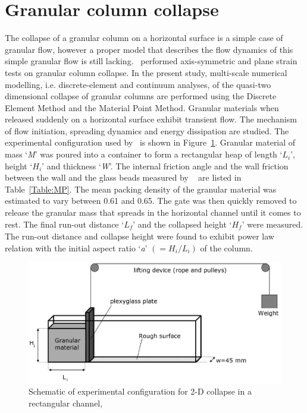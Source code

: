 \section{Granular column collapse}
The collapse of a granular column on a horizontal surface is a simple case of 
granular flow, however a proper model that describes the flow dynamics of this 
simple granular flow is still lacking.~\citet{Lajeunesse2005} performed 
axis-symmetric and plane strain tests on granular column collapse. In the 
present study, multi-scale numerical modelling, i.e. discrete-element and 
continuum analyses, of the quasi-two dimensional collapse of granular columns 
are performed using the Discrete Element Method and the Material Point Method. 
Granular materials when released suddenly on a horizontal surface exhibit 
transient flow. The mechanism of flow initiation, spreading dynamics and energy 
dissipation are studied. The experimental configuration used 
by~\citet{Lajeunesse2005} is shown in Figure~\ref{fig:exp}. Granular material 
of mass `\textit{M}' was poured into a container to form a rectangular heap of 
length `${L}_{\textit{i}}$', height `${H}_{\textit{i}}$' and thickness 
`\textit{W}'. The internal friction angle and the wall friction between the 
wall and the glass beads measured by ~\citet{Lajeunesse2005} are listed in 
Table~\ref{Table:MP}. The mean packing density of the granular material was 
estimated to vary between 0.61 and 0.65. The gate was then quickly removed to 
release the granular mass that spreads in the horizontal channel until it comes 
to rest. The final run-out distance `${L}_{\textit{f}}$' and the collapsed 
height `$H_{\textit{f}}$' were measured. The run-out distance and collapse 
height were found to exhibit power law relation with the initial aspect ratio 
`\textit{a}' $(=H_{\textit{i}}/L_{\textit{i}})$ of the column. 

\begin{figure}[tbhp]
\centering
\includegraphics[scale=0.15]{experiment_setup}
\caption{Schematic of experimental configuration for 2-D collapse in a 
rectangular channel,~\citep{Lajeunesse2005}}
\label{fig:exp}
\end{figure}

